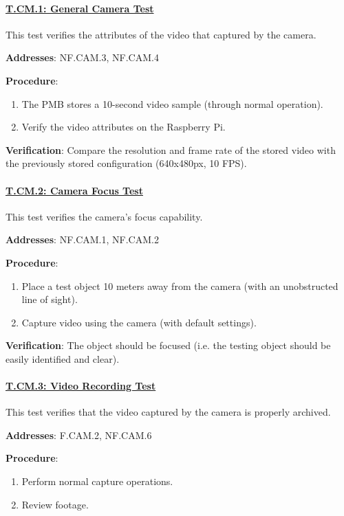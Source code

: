 \paragraph{\underline{T.CM.1: General Camera Test}}

This test verifies the attributes of the video that captured by the camera.

\textbf{Addresses}: NF.CAM.3, NF.CAM.4

\textbf{Procedure}:
\begin{enumerate}[noitemsep]
    \item The PMB stores a 10-second video sample (through normal operation).
    \item Verify the video attributes on the Raspberry Pi.
\end{enumerate}

\textbf{Verification}: 
Compare the resolution and frame rate of the stored video with the previously stored configuration (640x480px,  10 FPS).

%

\paragraph{\underline{T.CM.2: Camera Focus Test}}

This test verifies the camera's focus capability.

\textbf{Addresses}: NF.CAM.1, NF.CAM.2

\textbf{Procedure}:
\begin{enumerate}[noitemsep]
    \item Place a test object 10 meters away from the camera (with an unobstructed line of sight).
    \item Capture video using the camera (with default settings).
\end{enumerate}

\textbf{Verification}: 
The object should be focused (i.e. the testing object should be easily identified and clear).

%

\paragraph{\underline{T.CM.3: Video Recording Test}}

This test verifies that the video captured by the camera is properly archived.

\textbf{Addresses}: F.CAM.2, NF.CAM.6

\textbf{Procedure}:
\begin{enumerate}[noitemsep]
    \item Perform normal capture operations.
    \item Review footage.
\end{enumerate}

